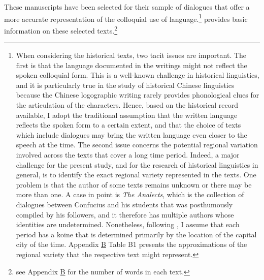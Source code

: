 \documentclass[output=paper]{langscibook}
\begin{document}
These manuscripts have been selected for their sample of dialogues that offer a more accurate representation of the colloquial use of language.\footnote{When considering the historical texts, two tacit issues are important. The first is that the language documented in the writings might not reflect the spoken colloquial form. This is a well-known challenge in historical linguistics, and it is particularly true in the study of historical Chinese linguistics because the Chinese logographic writing rarely provides phonological clues for the articulation of the characters. Hence, based on the historical record available, I adopt the traditional assumption that the written language reflects the spoken form to a certain extent, and that the choice of texts which include dialogues may bring the written language even closer to the speech at the time. The second issue concerns the potential regional variation involved across the texts that cover a long time period. Indeed, a major challenge for the present study, and for the research of historical linguistics in general, is to identify the exact regional variety represented in the texts. One problem is that the author of some texts remains unknown or there may be more than one. A case in point is \emph{The Analects}, which is the collection of dialogues between Confucius and his students that was posthumously compiled by his followers, and it therefore has multiple authors whose identities are undetermined. Nonetheless, following \cite{TaiChan1999}, I assume that each period has a koine that is determined primarily by the location of the capital city of the time. Appendix \hyperlink{app:lamB}{B} Table B1 presents the approximations of the regional variety that the respective text might represent.}
 provides basic information on these selected texts.\footnote{see Appendix \hyperlink{app:lamB}{B}  for the number of words in each text.}
\end{document}
